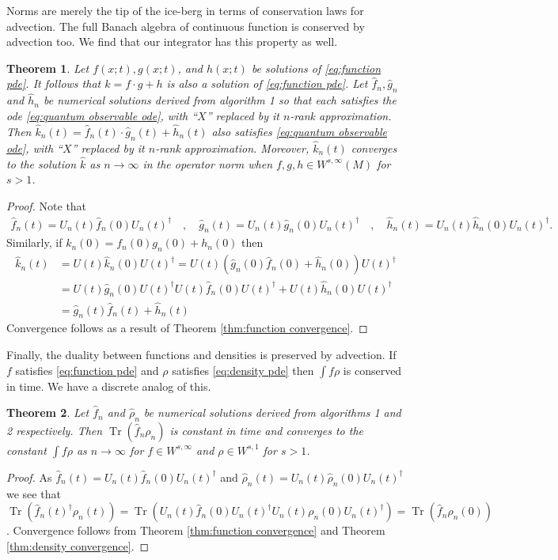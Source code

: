 \documentclass[12pt]{amsart}
\newtheorem{thm}{Theorem}[section]
\DeclareMathOperator{\Tr}{Tr}
\begin{document}
Norms are merely the tip of the ice-berg in terms of conservation laws for advection.
The full Banach algebra of continuous function is conserved by advection too.
We find that our integrator has this property as well.
\begin{thm} \label{thm:algebra}
	Let $f(x;t),g(x;t)$, and $h(x;t)$ be solutions of \eqref{eq:function pde}.
	It follows that $k= f \cdot g + h $ is also a solution of \eqref{eq:function pde}.
	Let $\hat{f}_{n}, \hat{g}_{n}$ and $\hat{h}_{n}$ be numerical solutions derived from algorithm 1
	so that each satisfies the ode \eqref{eq:quantum observable ode}, with ``$X$'' replaced by it $n$-rank approximation.
	Then $\hat{k}_{n}(t) = \hat{f}_{n}(t) \cdot \hat{g}_{n}(t) + \hat{h}_{n}(t)$ also satisfies \eqref{eq:quantum observable ode}, with ``$X$'' replaced by it $n$-rank approximation.
	Moreover, $\hat{k}_{n}(t)$ converges to the solution $\hat{k}$ as $n \to \infty$ in the operator norm when $f,g,h \in W^{s,\infty}(M)$ for $s>1$.
\end{thm}
\begin{proof}
	Note that 
	\begin{align}
		\hat{f}_{n}(t) = U_{n}(t) \hat{f}_{n}(0) U_{n}(t)^{\dagger} \quad,\quad 
		\hat{g}_{n}(t) = U_{n}(t) \hat{g}_{n}(0) U_{n}(t)^{\dagger} \quad,\quad
		\hat{h}_{n}(t) = U_{n}(t) \hat{h}_{n}(0) U_{n}(t)^{\dagger}.
	\end{align}
	Similarly, if $k_{n}(0) = f_{n}(0) g_{n}(0) + h_{n}(0)$ then
	\begin{align}
		\hat{k}_{n}(t) &= U(t) \hat{k}_{n}(0) U(t)^{\dagger} = U(t)\left( \hat{g}_{n}(0) \hat{f}_{n}(0) + \hat{h}_{n}(0) \right) U(t)^{\dagger} \\
			&= U(t) \hat{g}_{n}(0) U(t)^{\dagger} U(t) \hat{f}_{n}(0) U(t)^{\dagger} + U(t) \hat{h}_{n}(0) U(t)^{\dagger} \\
			&= \hat{g}_{n}(t) \hat{f}_{n}(t) + \hat{h}_{n}(t)
	\end{align}
	Convergence follows as a result of Theorem \ref{thm:function convergence}.
\end{proof}

Finally, the duality between functions and densities is preserved by advection.  If $f$ satisfies \eqref{eq:function pde} and $\rho $ satisfies \eqref{eq:density pde} then $\int f \rho$ is conserved in time.
We have a discrete analog of this.
\begin{thm}
	Let $\hat{f}_{n}$ and $\hat{\rho}_{n}$ be numerical solutions derived from algorithms 1 and 2 respectively.
	Then $\Tr( \hat{f}_{n} \rho_{n} )$ is constant in time and converges to the constant $\int f \rho$ as $n \to \infty$
	for $f \in W^{s,\infty}$ and $\rho \in W^{s,1}$ for $s>1$.
\end{thm}
\begin{proof}
	As $\hat{f}_{n}(t) = U_{n}(t) \hat{f}_{n}(0) U_{n}(t)^{\dagger}$ and $\hat{\rho}_{n}(t) = U_{n}(t) \hat{\rho}_{n}(0) U_{n}(t)^{\dagger}$
	we see that $\Tr( \hat{f}_{n}(t)^{\dagger} \rho_{n}(t) ) = \Tr( U_{n}(t) \hat{f}_{n}(0) U_{n}(t)^{\dagger} U_{n}(t) \rho_{n}(0) U_{n}(t)^{\dagger}) = \Tr( \hat{f}_{n} \rho_{n}(0) )$.
	Convergence follows from Theorem \ref{thm:function convergence} and Theorem \ref{thm:density convergence}.
\end{proof}
\end{document}
